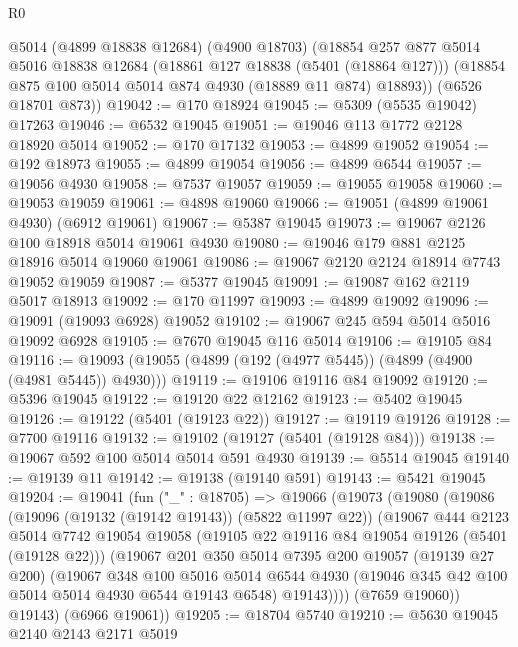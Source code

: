 \begin{lexlean}{R0}
\begin{coremodule}
      @5014
      (@4899 @18838 @12684)
      (@4900 @18703)
      (@18854
        @257
        @877
        @5014
        @5016
        @18838
        @12684
        (@18861 @127 @18838 (@5401 (@18864 @127)))
        (@18854 @875 @100 @5014 @5014 @874 @4930 (@18889 @11 @874) @18893))
      (@6526 @18701 @873))
@19042 := @170 @18924
@19045 := @5309 (@5535 @19042) @17263
@19046 := @6532 @19045
@19051 := @19046 @113 @1772 @2128 @18920 @5014
@19052 := @170 @17132
@19053 := @4899 @19052
@19054 := @192 @18973
@19055 := @4899 @19054
@19056 := @4899 @6544
@19057 := @19056 @4930
@19058 := @7537 @19057
@19059 := @19055 @19058
@19060 := @19053 @19059
@19061 := @4898 @19060
@19066 := @19051 (@4899 @19061 @4930) (@6912 @19061)
@19067 := @5387 @19045
@19073 := @19067 @2126 @100 @18918 @5014 @19061 @4930
@19080 := @19046 @179 @881 @2125 @18916 @5014 @19060 @19061
@19086 := @19067 @2120 @2124 @18914 @7743 @19052 @19059
@19087 := @5377 @19045
@19091 := @19087 @162 @2119 @5017 @18913
@19092 := @170 @11997
@19093 := @4899 @19092
@19096 := @19091 (@19093 @6928) @19052
@19102 := @19067 @245 @594 @5014 @5016 @19092 @6928
@19105 := @7670 @19045 @116 @5014
@19106 := @19105 @84
@19116 := @19093 (@19055 (@4899 (@192 (@4977 @5445)) (@4899 (@4900 (@4981 @5445)) @4930)))
@19119 := @19106 @19116 @84 @19092
@19120 := @5396 @19045
@19122 := @19120 @22 @12162
@19123 := @5402 @19045
@19126 := @19122 (@5401 (@19123 @22))
@19127 := @19119 @19126
@19128 := @7700 @19116
@19132 := @19102 (@19127 (@5401 (@19128 @84)))
@19138 := @19067 @592 @100 @5014 @5014 @591 @4930
@19139 := @5514 @19045
@19140 := @19139 @11
@19142 := @19138 (@19140 @591)
@19143 := @5421 @19045
@19204 := @19041
    (fun ("_" : @18705) =>
    @19066
      (@19073
        (@19080
          (@19086
            (@19096 (@19132 (@19142 @19143)) (@5822 @11997 @22))
            (@19067
              @444
              @2123
              @5014
              @7742
              @19054
              @19058
              (@19105 @22 @19116 @84 @19054 @19126 (@5401 (@19128 @22)))
              (@19067
                @201
                @350
                @5014
                @7395
                @200
                @19057
                (@19139 @27 @200)
                (@19067
                  @348
                  @100
                  @5016
                  @5014
                  @6544
                  @4930
                  (@19046 @345 @42 @100 @5014 @5014 @4930 @6544 @19143 @6548)
                  @19143))))
          (@7659 @19060))
        @19143)
      (@6966 @19061))
@19205 := @18704 @5740
@19210 := @5630 @19045 @2140 @2143 @2171 @5019

\end{coremodule}
\end{lexlean}
